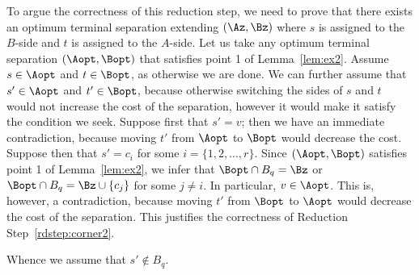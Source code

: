 To argue the correctness of this reduction step, we need to prove that there exists an optimum terminal separation extending $(\Az,\Bz)$ where $s$ is assigned to the $B$-side and $t$ is assigned to the $A$-side. Let us take any optimum terminal separation $(\Aopt,\Bopt)$
that satisfies point 1 of Lemma~\ref{lem:ex2}.
Assume $s\in \Aopt$ and $t\in \Bopt$, as otherwise we are done.
We can further assume that $s'\in \Aopt$ and $t'\in \Bopt$, because otherwise switching the sides of $s$ and $t$ would not increase the cost of the separation, however it would make it satisfy the condition we seek.
Suppose first that $s'=v$; then we have an immediate contradiction, because moving $t'$ from $\Aopt$ to $\Bopt$ would decrease the cost.
Suppose then that $s'=c_i$ for some $i=\{1,2,\ldots,r\}$.
Since $(\Aopt,\Bopt)$ satisfies point 1 of Lemma~\ref{lem:ex2},
we infer that $\Bopt\cap B_q=\Bz$ or $\Bopt\cap B_q=\Bz\cup \{c_j\}$ for some $j\neq i$. In particular, $v\in \Aopt$. This is, however, a contradiction, because moving $t'$ from $\Bopt$ to $\Aopt$ would decrease the cost of the separation. This justifies the correctness of Reduction Step~\ref{rdstep:corner2}.

Whence we assume that $s'\notin B_q$.

